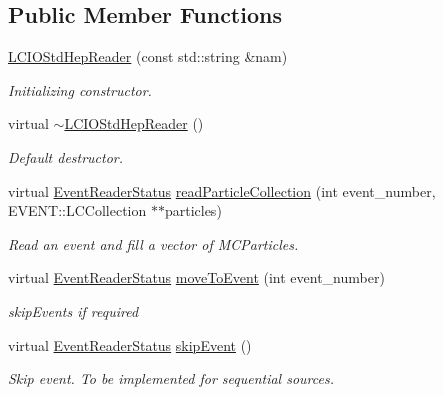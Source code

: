 \subsection*{Public Member Functions}
\begin{DoxyCompactItemize}
\item 
\hyperlink{class_d_d4hep_1_1_simulation_1_1_l_c_i_o_std_hep_reader_ae877c907bf826120cc697aa80a39aba7}{L\+C\+I\+O\+Std\+Hep\+Reader} (const std\+::string \&nam)
\begin{DoxyCompactList}\small\item\em Initializing constructor. \end{DoxyCompactList}\item 
virtual \hyperlink{class_d_d4hep_1_1_simulation_1_1_l_c_i_o_std_hep_reader_a8435282d1017281ed60c84dee829859e}{$\sim$\+L\+C\+I\+O\+Std\+Hep\+Reader} ()
\begin{DoxyCompactList}\small\item\em Default destructor. \end{DoxyCompactList}\item 
virtual \hyperlink{class_d_d4hep_1_1_simulation_1_1_geant4_event_reader_ae4f4bc83ffcf5b0c1868ad78859851e7}{Event\+Reader\+Status} \hyperlink{class_d_d4hep_1_1_simulation_1_1_l_c_i_o_std_hep_reader_ab358476ce7a1bab27504d2bfe4b8b630}{read\+Particle\+Collection} (int event\+\_\+number, E\+V\+E\+N\+T\+::\+L\+C\+Collection $\ast$$\ast$particles)
\begin{DoxyCompactList}\small\item\em Read an event and fill a vector of M\+C\+Particles. \end{DoxyCompactList}\item 
virtual \hyperlink{class_d_d4hep_1_1_simulation_1_1_geant4_event_reader_ae4f4bc83ffcf5b0c1868ad78859851e7}{Event\+Reader\+Status} \hyperlink{class_d_d4hep_1_1_simulation_1_1_l_c_i_o_std_hep_reader_a5f91d2bbdab11ee4554abf164acf1e1e}{move\+To\+Event} (int event\+\_\+number)
\begin{DoxyCompactList}\small\item\em skip\+Events if required \end{DoxyCompactList}\item 
virtual \hyperlink{class_d_d4hep_1_1_simulation_1_1_geant4_event_reader_ae4f4bc83ffcf5b0c1868ad78859851e7}{Event\+Reader\+Status} \hyperlink{class_d_d4hep_1_1_simulation_1_1_l_c_i_o_std_hep_reader_a54ae13b39268486b6edc4a7f9a11ada3}{skip\+Event} ()
\begin{DoxyCompactList}\small\item\em Skip event. To be implemented for sequential sources. \end{DoxyCompactList}\end{DoxyCompactItemize}
